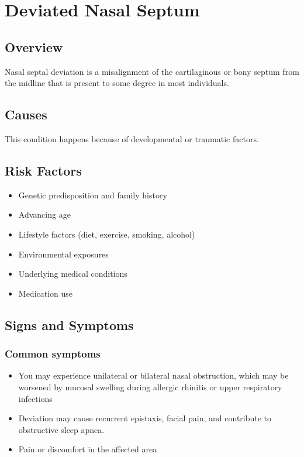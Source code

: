 \chapter{Deviated Nasal Septum}
\label{sec:Deviated Nasal Septum}

\section{Overview}
Nasal septal deviation is a misalignment of the cartilaginous or bony septum from the midline that is present to some degree in most individuals.
\section{Causes}
This condition happens because of developmental or traumatic factors.     
\section{Risk Factors}

\begin{itemize}[noitemsep]
  \item Genetic predisposition and family history
  \item Advancing age
  \item Lifestyle factors (diet, exercise, smoking, alcohol)
  \item Environmental exposures
  \item Underlying medical conditions
  \item Medication use
\end{itemize}
\section{Signs and Symptoms}

\subsection{Common symptoms}
\begin{itemize}[noitemsep]
  \item You may experience unilateral or bilateral nasal obstruction, which may be worsened by mucosal swelling during allergic rhinitis or upper respiratory infections
  \item Deviation may cause recurrent epistaxis, facial pain, and contribute to obstructive sleep apnea.
  \item Pain or discomfort in the affected area
  \end{itemize}

